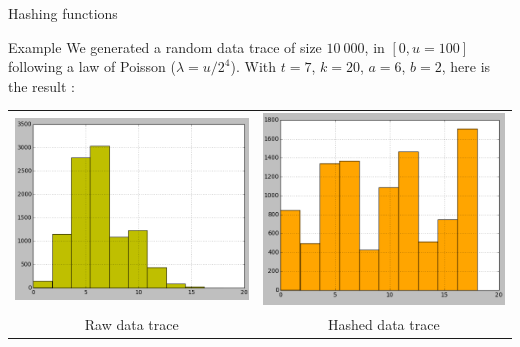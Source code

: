 \documentclass[mathserif]{beamer}
\begin{document}
	\begin{frame}{Hashing functions}
	
	\begin{exampleblock}{Example}
	We generated a random data trace of size $10~000$, in $\left[0, u = 100\right]$ following a law of Poisson ($\lambda = u/2^4$). With $t=7$, $k=20$, $a=6$, $b=2$, here is the result :
	
	\begin{center}
	\begin{tabular}{cc}
		\includegraphics[scale=0.25]{poisson4.png} &
		\includegraphics[scale=0.25]{poisson4_hashed.png} \\
		Raw data trace & Hashed data trace \\
	\end{tabular}
	\end{center}
	
	\end{exampleblock}

	\end{frame}
	
\end{document}
